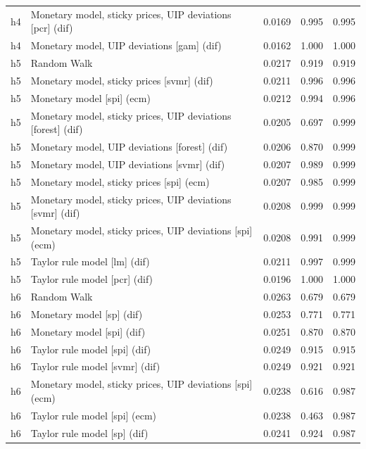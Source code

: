 \begin{ThreePartTable}
\begin{longtable}[t]{cp{5.5cm}ccc}
h4 & \raggedright Monetary model, sticky prices, UIP deviations [pcr] (dif) & 0.0169 & 0.995 & 0.995\\
h4 & \raggedright Monetary model, UIP deviations [gam] (dif) & 0.0162 & 1.000 & 1.000\\
\addlinespace
h5 & \raggedright Random Walk & 0.0217 & 0.919 & 0.919\\
h5 & \raggedright Monetary model, sticky prices [svmr] (dif) & 0.0211 & 0.996 & 0.996\\
h5 & \raggedright Monetary model [spi] (ecm) & 0.0212 & 0.994 & 0.996\\
h5 & \raggedright Monetary model, sticky prices, UIP deviations [forest] (dif) & 0.0205 & 0.697 & 0.999\\
h5 & \raggedright Monetary model, UIP deviations [forest] (dif) & 0.0206 & 0.870 & 0.999\\
h5 & \raggedright Monetary model, UIP deviations [svmr] (dif) & 0.0207 & 0.989 & 0.999\\
h5 & \raggedright Monetary model, sticky prices [spi] (ecm) & 0.0207 & 0.985 & 0.999\\
h5 & \raggedright Monetary model, sticky prices, UIP deviations [svmr] (dif) & 0.0208 & 0.999 & 0.999\\
h5 & \raggedright Monetary model, sticky prices, UIP deviations [spi] (ecm) & 0.0208 & 0.991 & 0.999\\
h5 & \raggedright Taylor rule model [lm] (dif) & 0.0211 & 0.997 & 0.999\\
h5 & \raggedright Taylor rule model [pcr] (dif) & 0.0196 & 1.000 & 1.000\\
\addlinespace
h6 & \raggedright Random Walk & 0.0263 & 0.679 & 0.679\\
h6 & \raggedright Monetary model [sp] (dif) & 0.0253 & 0.771 & 0.771\\
h6 & \raggedright Monetary model [spi] (dif) & 0.0251 & 0.870 & 0.870\\
h6 & \raggedright Taylor rule model [spi] (dif) & 0.0249 & 0.915 & 0.915\\
h6 & \raggedright Taylor rule model [svmr] (dif) & 0.0249 & 0.921 & 0.921\\
h6 & \raggedright Monetary model, sticky prices, UIP deviations [spi] (ecm) & 0.0238 & 0.616 & 0.987\\
h6 & \raggedright Taylor rule model [spi] (ecm) & 0.0238 & 0.463 & 0.987\\
h6 & \raggedright Taylor rule model [sp] (dif) & 0.0241 & 0.924 & 0.987\\

\end{longtable}
\end{ThreePartTable}
